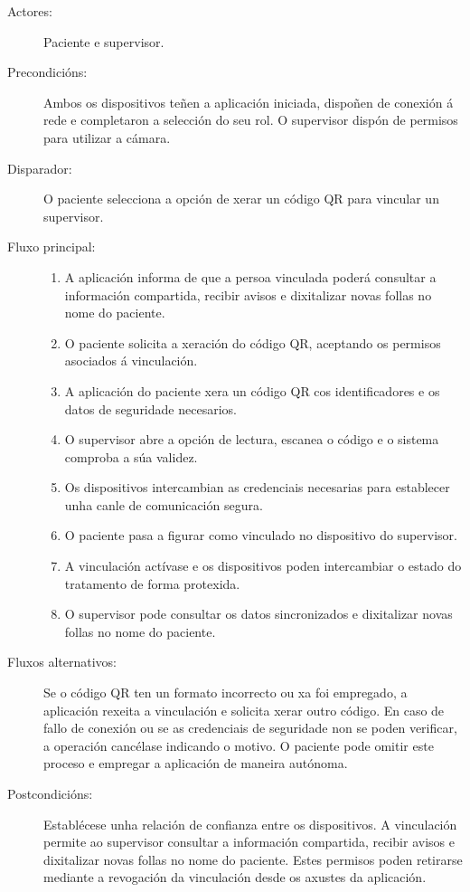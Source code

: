 \begin{description}
    \item[Actores:] Paciente e supervisor.

    \item[Precondicións:] Ambos os dispositivos teñen a aplicación iniciada, dispoñen de conexión á rede e completaron a selección do seu rol. O supervisor dispón de permisos para utilizar a cámara.

    \item[Disparador:] O paciente selecciona a opción de xerar un código QR para vincular un supervisor.

    \item[Fluxo principal:] \hfill
    \begin{enumerate}
        \item A aplicación informa de que a persoa vinculada poderá consultar a información compartida, recibir avisos e dixitalizar novas follas no nome do paciente.
        \item O paciente solicita a xeración do código QR, aceptando os permisos asociados á vinculación.
        \item A aplicación do paciente xera un código QR cos identificadores e os datos de seguridade necesarios.
        \item O supervisor abre a opción de lectura, escanea o código e o sistema comproba a súa validez.
        \item Os dispositivos intercambian as credenciais necesarias para establecer unha canle de comunicación segura.
        \item O paciente pasa a figurar como vinculado no dispositivo do supervisor.
        \item A vinculación actívase e os dispositivos poden intercambiar o estado do tratamento de forma protexida.
        \item O supervisor pode consultar os datos sincronizados e dixitalizar novas follas no nome do paciente.
    \end{enumerate}

    \item[Fluxos alternativos:] Se o código QR ten un formato incorrecto ou xa foi empregado, a aplicación rexeita a vinculación e solicita xerar outro código. En caso de fallo de conexión ou se as credenciais de seguridade non se poden verificar, a operación cancélase indicando o motivo. O paciente pode omitir este proceso e empregar a aplicación de maneira autónoma.

    \item[Postcondicións:] Establécese unha relación de confianza entre os dispositivos. A vinculación permite ao supervisor consultar a información compartida, recibir avisos e dixitalizar novas follas no nome do paciente. Estes permisos poden retirarse mediante a revogación da vinculación desde os axustes da aplicación.
\end{description}

